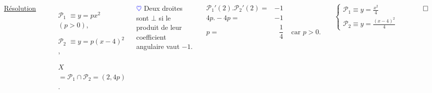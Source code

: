 \documentclass[10pt]{beamer}
\def \heart {\textcolor{blue}{$\heartsuit$} }
\begin{document}
{\begin{columns}[t]
		
		\flushleft
		
		\underline{Résolution}\\
		
		\begin{enumerate}

		\item[$\mathcal{P}_1$] $\equiv y=px^2$ $(p>0)$,
		\item[$\mathcal{P}_2$] $\equiv y=p(x-4)^2$,
		\item[$X$] $= \mathcal{P}_1 \cap \mathcal{P}_2 = (2,4p)$.
		\end{enumerate} \bigskip
		
		\heart Deux droites sont $\bot$ si le produit de leur coefficient angulaire vaut $-1$.
		 
	
		\begin{align*}
		\mathcal{P}_1'(2).\mathcal{P}_2'(2) =& -1& \\
		4p.-4p =& -1& \\
		p=& \text{ }\dfrac{1}{4} &\text{ car } p>0. \\ 
		\end{align*}
		
		$\begin{cases}\mathcal{P}_1\equiv y=\frac{x^2}{4} \\
			      \mathcal{P}_2\equiv y=\frac{(x-4)^2}{4}
		  \end{cases}$
		
		\hfill $\qed$
   
	   \end{columns}
  
  
	}
  
\end{document}
